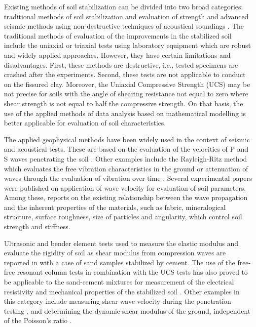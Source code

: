 \documentclass[final,3p,times,onecolumn,authoryear]{elsarticle}
\begin{document}
Existing methods of soil stabilization can be divided into two broad categories: traditional methods of soil stabilization and evaluation of strength \citep{Trhl,LindhLemenkova2022a,Heidarizadeh} and advanced seismic methods using non-destructive techniques of acoustical soundings \citep{Varma,Foti,LindhLemenkova2021b,GarciaSuarez}. The traditional methods of evaluation of the improvements in the stabilized soil include the uniaxial \citep{Avci,Lapointe,XuYi} or triaxial \citep{ALVARADO} tests using laboratory equipment which are robust and widely applied approaches. However, they have certain limitations and disadvantages. First, these methods are destructive, i.e., tested specimens are crashed after the experiments. Second, these tests are not applicable to conduct on the fissured clay. Moreover, the Uniaxial Compressive Strength (UCS) may be not precise for soils with the angle of shearing resistance not equal to zero where shear strength is not equal to half the compressive strength. On that basis, the use of the applied methods of data analysis based on mathematical modelling \citep{Jefferies} is better applicable for evaluation of soil characteristics.

The applied geophysical methods have been widely used in the context of seismic and acoustical tests. These are based on the evaluation of the velocities of P and S waves penetrating the soil \citep{Safaee,LindhLemenkova2022c,FotiLancellotta}. Other examples include the Rayleigh-Ritz method which evaluates the free vibration characteristics in the ground \citep{SonkarMittal,Jones} or attenuation of waves through the evaluation of vibration over time \citep{Colombero}. Several experimental papers were published on application of wave velocity for evaluation of soil parameters. Among these, \cite{Santamarina} reports on the existing relationship between the wave propagation and the inherent properties of the materials, such as fabric, mineralogical structure, surface roughness, size of particles and angularity, which control soil strength and stiffness.

Ultrasonic and bender element tests used to measure the elastic modulus and evaluate the rigidity of soil as shear modulus from compression waves are reported in \cite{Amaral} with a case of sand samples stabilized by cement. The use of the free-free resonant column tests in combination with the UCS tests has also proved to be applicable to the sand-cement mixtures for measurement of the electrical resistivity and mechanical properties of the stabilized soil \citep{Rusati}. Other examples in this category include measuring shear wave velocity during the penetration testing \citep{Hepton1989}, and determining the dynamic shear modulus of the ground, independent of the Poisson's ratio \citep{Abbiss}. 
\end{document}
